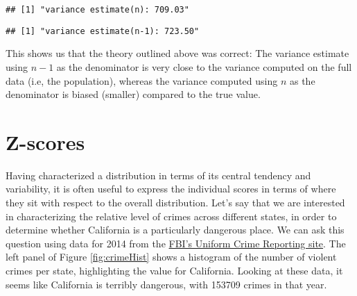 \documentclass[]{book}
\newenvironment{Shaded}{\begin{snugshade}}{\end{snugshade}}
\newcommand{\KeywordTok}[1]{\textcolor[rgb]{0.13,0.29,0.53}{\textbf{#1}}}
\newcommand{\DataTypeTok}[1]{\textcolor[rgb]{0.13,0.29,0.53}{#1}}
\newcommand{\StringTok}[1]{\textcolor[rgb]{0.31,0.60,0.02}{#1}}
\newcommand{\CommentTok}[1]{\textcolor[rgb]{0.56,0.35,0.01}{\textit{#1}}}
\newcommand{\OtherTok}[1]{\textcolor[rgb]{0.56,0.35,0.01}{#1}}
\newcommand{\OperatorTok}[1]{\textcolor[rgb]{0.81,0.36,0.00}{\textbf{#1}}}
\newcommand{\NormalTok}[1]{#1}
\theoremstyle{definition}
\theoremstyle{definition}
\theoremstyle{definition}
\theoremstyle{remark}
\begin{document}
\begin{verbatim}
## [1] "variance estimate(n): 709.03"
\end{verbatim}

\begin{Shaded}
\end{Shaded}

\begin{verbatim}
## [1] "variance estimate(n-1): 723.50"
\end{verbatim}

This shows us that the theory outlined above was correct: The variance
estimate using \(n - 1\) as the denominator is very close to the
variance computed on the full data (i.e, the population), whereas the
variance computed using \(n\) as the denominator is biased (smaller)
compared to the true value.

\section{Z-scores}\label{z-scores}

\begin{Shaded}
\end{Shaded}

Having characterized a distribution in terms of its central tendency and
variability, it is often useful to express the individual scores in
terms of where they sit with respect to the overall distribution. Let's
say that we are interested in characterizing the relative level of
crimes across different states, in order to determine whether California
is a particularly dangerous place. We can ask this question using data
for 2014 from the
\href{https://www.ucrdatatool.gov/Search/Crime/State/RunCrimeOneYearofData.cfm}{FBI's
Uniform Crime Reporting site}. The left panel of Figure
\ref{fig:crimeHist} shows a histogram of the number of violent crimes
per state, highlighting the value for California. Looking at these data,
it seems like California is terribly dangerous, with 153709 crimes in
that year.
\end{document}
